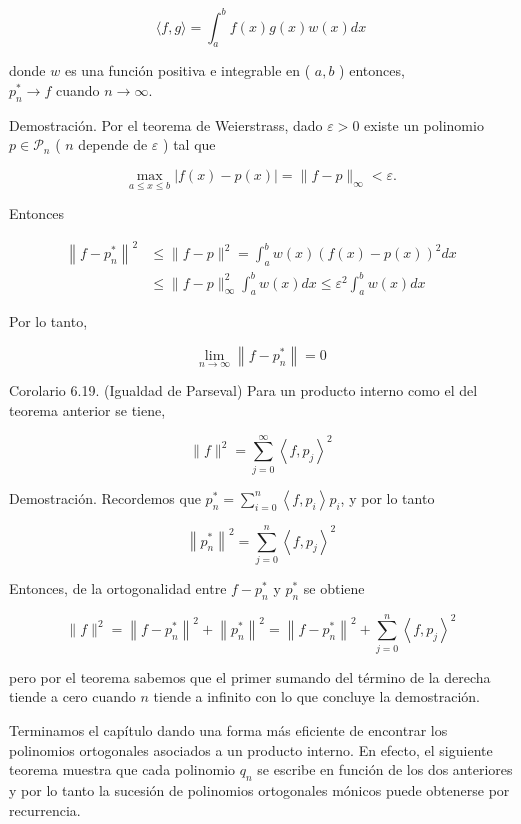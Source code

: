 \documentclass[10pt]{article}
\begin{document}
$$
\langle f, g\rangle=\int_{a}^{b} f(x) g(x) w(x) d x
$$

donde $w$ es una función positiva e integrable en ( $a, b$ ) entonces,\\
$p_{n}^{*} \longrightarrow f$ cuando $n \longrightarrow \infty$.

Demostración. Por el teorema de Weierstrass, dado $\varepsilon>0$ existe un polinomio $p \in \mathcal{P}_{n}$ ( $n$ depende de $\varepsilon$ ) tal que

$$
\max _{a \leq x \leq b}|f(x)-p(x)|=\|f-p\|_{\infty}<\varepsilon .
$$

Entonces

$$
\begin{aligned}
\left\|f-p_{n}^{*}\right\|^{2} & \leq\|f-p\|^{2}=\int_{a}^{b} w(x)(f(x)-p(x))^{2} d x \\
& \leq\|f-p\|_{\infty}^{2} \int_{a}^{b} w(x) d x \leq \varepsilon^{2} \int_{a}^{b} w(x) d x
\end{aligned}
$$

Por lo tanto,

$$
\lim _{n \rightarrow \infty}\left\|f-p_{n}^{*}\right\|=0
$$

Corolario 6.19. (Igualdad de Parseval) Para un producto interno como el del teorema anterior se tiene,

$$
\|f\|^{2}=\sum_{j=0}^{\infty}\left\langle f, p_{j}\right\rangle^{2}
$$

Demostración. Recordemos que $p_{n}^{*}=\sum_{i=0}^{n}\left\langle f, p_{i}\right\rangle p_{i}$, y por lo tanto

$$
\left\|p_{n}^{*}\right\|^{2}=\sum_{j=0}^{n}\left\langle f, p_{j}\right\rangle^{2}
$$

Entonces, de la ortogonalidad entre $f-p_{n}^{*}$ y $p_{n}^{*}$ se obtiene

$$
\|f\|^{2}=\left\|f-p_{n}^{*}\right\|^{2}+\left\|p_{n}^{*}\right\|^{2}=\left\|f-p_{n}^{*}\right\|^{2}+\sum_{j=0}^{n}\left\langle f, p_{j}\right\rangle^{2}
$$

pero por el teorema sabemos que el primer sumando del término de la derecha tiende a cero cuando $n$ tiende a infinito con lo que concluye la demostración.

Terminamos el capítulo dando una forma más eficiente de encontrar los polinomios ortogonales asociados a un producto interno. En efecto, el siguiente teorema muestra que cada polinomio $q_{n}$ se escribe en función de los dos anteriores y por lo tanto la sucesión de polinomios ortogonales mónicos puede obtenerse por recurrencia.
\end{document}
